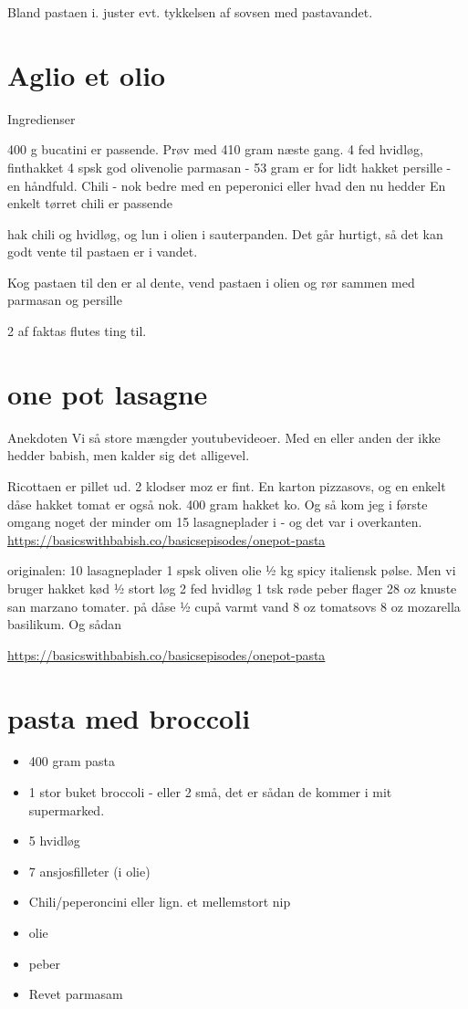 \documentclass[
]{book}
\providecommand{\tightlist}{%
  \setlength{\itemsep}{0pt}\setlength{\parskip}{0pt}}
\begin{document}
Bland pastaen i. juster evt. tykkelsen af sovsen med pastavandet.

\hypertarget{aglio-et-olio}{%
\section{Aglio et olio}\label{aglio-et-olio}}

Ingredienser

400 g bucatini er passende. Prøv med 410 gram næste gang.
4 fed hvidløg, finthakket
4 spsk god olivenolie
parmasan - 53 gram er for lidt
hakket persille - en håndfuld.
Chili - nok bedre med en peperonici eller hvad den nu hedder En enkelt tørret chili er passende

hak chili og hvidløg, og lun i olien i sauterpanden. Det går hurtigt, så det kan godt vente til pastaen er i vandet.

Kog pastaen til den er al dente,
vend pastaen i olien og rør sammen med parmasan og persille

2 af faktas flutes ting til.

\hypertarget{one-pot-lasagne}{%
\section{one pot lasagne}\label{one-pot-lasagne}}

Anekdoten
Vi så store mængder youtubevideoer. Med en eller anden der ikke hedder babish, men kalder sig det alligevel.

Ricottaen er pillet ud. 2 klodser moz er fint. En karton pizzasovs, og en enkelt dåse hakket tomat er også nok.
400 gram hakket ko.
Og så kom jeg i første omgang noget der minder om 15 lasagneplader i - og det var i overkanten.
\url{https://basicswithbabish.co/basicsepisodes/onepot-pasta}

originalen:
10 lasagneplader
1 spsk oliven olie
½ kg spicy italiensk pølse. Men vi bruger hakket kød
½ stort løg
2 fed hvidløg
1 tsk røde peber flager
28 oz knuste san marzano tomater. på dåse
½ cupå varmt vand
8 oz tomatsovs
8 oz mozarella
basilikum. Og sådan

\url{https://basicswithbabish.co/basicsepisodes/onepot-pasta}

\hypertarget{pasta-med-broccoli}{%
\section{pasta med broccoli}\label{pasta-med-broccoli}}

\begin{itemize}
\tightlist
\item
  400 gram pasta
\item
  1 stor buket broccoli - eller 2 små, det er sådan de kommer i mit supermarked.
\item
  5 hvidløg
\item
  7 ansjosfilleter (i olie)
\item
  Chili/peperoncini eller lign. et mellemstort nip
\item
  olie
\item
  peber
\item
  Revet parmasam
\end{itemize}
\end{document}
